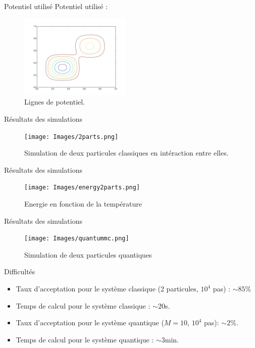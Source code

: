 \documentclass{beamer}
\begin{document}
\begin{frame}{Potentiel utilisé}
    Potentiel utilisé : 
    \begin{figure}
        \centering
        \includegraphics[height=4cm]{Images/potentialiso.jpeg}
        \caption{Lignes de potentiel.}
    \end{figure}
\end{frame}

\begin{frame}{Résultats des simulations}
    \begin{figure}
        \centering
        \texttt{[image: Images/2parts.png]}
        \caption{Simulation de deux particules classiques en intéraction entre elles.}
        \end{figure}
\end{frame}

\begin{frame}{Résultats des simulations}
    \begin{figure}
        \centering
        \texttt{[image: Images/energy2parts.png]}
        \caption{Energie en fonction de la température}
    \end{figure}
\end{frame}

\begin{frame}{Résultats des simulations}
    \begin{figure}
        \centering
        \texttt{[image: Images/quantummc.png]}
        \caption{Simulation de deux particules quantiques}
    \end{figure}
\end{frame}

\begin{frame}{Difficultés}
    \begin{itemize}
        \item Taux d'acceptation pour le système classique (2 particules, $10^4$ pas) : $\sim85\%$ 
        \item Temps de calcul pour le système classique : $\sim 20$s. 
        \item Taux d'acceptation pour le système quantique ($M=10$, $10^4$ pas): $\sim 2\%$.
        \item Temps de calcul pour le système quantique : $\sim 3\mathrm{min}$.
    \end{itemize}
\end{frame}
\end{document}
